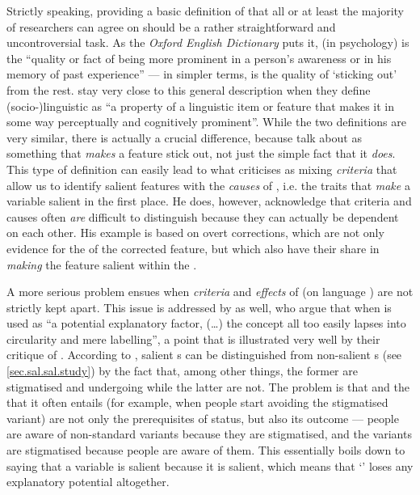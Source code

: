 Strictly speaking, providing a basic definition of  that all or at least the majority of researchers can agree on should be a rather straightforward and uncontroversial task.
As the \emph{Oxford English Dictionary} puts it,  (in psychology) is the ``quality or fact of being more prominent in a person's awareness or in his memory of past experience'' --- in simpler terms,  is the quality of `sticking out' from the rest.
\textcite[81]{kerswillwilliams2002} stay very close to this general description when they define (socio-)linguistic  as ``a property of a linguistic item or feature that makes it in some way perceptually and cognitively prominent''.
While the two definitions are very similar, there is actually a crucial difference, because \citeauthor{kerswillwilliams2002} talk about  as something that \emph{makes} a feature stick out, not just the simple fact that it \emph{does}.
This type of definition can easily lead to what \textcite[cf.][9]{auer2014} criticises as mixing \emph{criteria} that allow us to identify salient features with the \emph{causes} of , i.e. the traits that \emph{make} a variable salient in the first place.
He does, however, acknowledge that criteria and causes often \emph{are} difficult to distinguish because they can actually be dependent on each other.
His example is based on overt corrections, which are not only evidence for the  of the corrected feature, but which also have their share in \emph{making} the feature salient within the .

A more serious problem ensues when \emph{criteria} and \emph{effects} of  (on language ) are not strictly kept apart.
This issue is addressed by \textcite[82]{kerswillwilliams2002} as well, who argue that when  is used as ``a potential explanatory factor, (\ldots) the concept all too easily lapses into circularity and mere labelling'', a point that is illustrated very well by their critique of \textcite{trudgill1986}.
According to \citeauthor{trudgill1986}, salient s can be distinguished from non-salient s (see \ref{sec.sal.sal.study}) by the fact that, among other things, the former are stigmatised and undergoing  while the latter are not.
The problem is that  and the  that it often entails (for example, when people start avoiding the stigmatised variant) are not only the prerequisites of  status, but also its outcome --- people are aware of non-standard variants because they are stigmatised, and the variants are stigmatised because people are aware of them.
This essentially boils down to saying that a variable is salient because it is salient, which means that `' loses any explanatory potential altogether.

